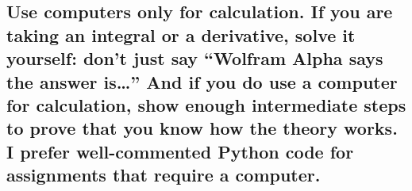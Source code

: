 \documentclass[11pt]{article}
\begin{document}
\begin{itemize}
  \section{Use computers only for calculation. If you are taking an
  integral or a derivative, solve it yourself: don't just say ``Wolfram
  Alpha says the answer is\ldots{}'' And if you do use a computer for
  calculation, show enough intermediate steps to prove that you know how
  the theory works. I prefer well-commented Python code for assignments
  that require a
  computer.}\label{use-computers-only-for-calculation.-if-you-are-taking-an-integral-or-a-derivative-solve-it-yourself-dont-just-say-wolfram-alpha-says-the-answer-is-and-if-you-do-use-a-computer-for-calculation-show-enough-intermediate-steps-to-prove-that-you-know-how-the-theory-works.-i-prefer-well-commented-python-code-for-assignments-that-require-a-computer.}
\end{itemize}
\end{document}
